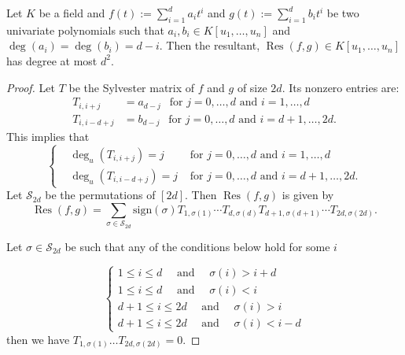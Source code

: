 \documentclass[10pt,a4paper]{amsart}
\DeclareMathOperator{\res}{{Res}}
\begin{document}
\begin{lemma}\label{lem: degree sylvester mat}
Let $K$ be a field and $f(t):=\sum_{i=1}^da_it^i$ and $g(t):=\sum_{i=1}^db_it^i$ be two univariate polynomials
	such that $a_i, b_i \in K[u_1,\ldots,u_n]$ and $\deg(a_i)=\deg(b_i)=d-i$. Then the resultant, ${\res}(f,g) \in K[u_1,\ldots,u_n]$ has degree at most $d^2$.
\end{lemma}

\begin{proof}
	Let $T$ be the Sylvester matrix of $f$ and $g$ of size $2d$. Its nonzero entries are:
	\begin{align*}
		T_{i,i+j} &= a_{d-j} ~~ \text{ for } j=0,\dots ,d  \mbox{ and } i=1,\dots, d \\
		T_{i,i-d+j} &= b_{d-j} ~~ \text{ for } j=0,\dots ,d  \mbox{ and } i=d+1,\dots, 2d.
	\end{align*} 
	This implies that 
	\begin{equation} \label{eq:deg_Sylvester}
		\left\{
		\begin{split}
			&\deg_u(T_{i,i+j})=j &\mbox{ for } j=0,\dots ,d  \mbox{ and } i=1,\dots, d \\
			&\deg_u(T_{i,i-d+j}) =j &\mbox{ for } j=0,\dots ,d  \mbox{ and } i=d+1,\dots, 2d.
		\end{split} \right.
	\end{equation}
	Let $\mathcal{S}_{2d}$ be the permutations of $[2d]$. Then ${\res}(f,g)$ is given by
	\[\res(f,g)=\sum_{\sigma \in \mathcal{S}_{2d}} \text{sign}(\sigma) T_{1,\sigma(1)}\cdots T_{d,\sigma(d)}T_{d+1,\sigma(d+1)}\cdots T_{2d,\sigma(2d)}.\]

	
	Let $\sigma \in \mathcal{S}_{2d}$ be such that any of the conditions below hold for some $i$ 
	
	\[\left\{ 
	\begin{array}{l}
		1\leq i \leq d \quad \mbox{ and } \quad \sigma(i) > i+d \\
		1\leq i \leq d \quad \mbox{ and } \quad \sigma(i) < i \\
		d+1 \leq i \leq 2d \quad \mbox{ and } \quad \sigma(i) > i \\
		d+1 \leq i \leq 2d \quad \mbox{ and } \quad \sigma(i) < i-d
	\end{array}
	\right.\] 
	then we have $T_{1,\sigma(1)}\dots T_{2d,\sigma(2d)}=0$.
	

\end{proof}
\end{document}
